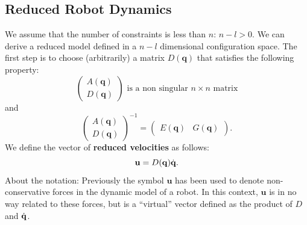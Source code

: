 \documentclass[10pt, a4paper]{report}
\newcommand{\q}{{\mathbf q}}
\begin{document}
\subsection{Reduced Robot Dynamics}
We assume that the number of constraints is less than $n$: $n-l>0$. We can derive a reduced model defined in a $n-l$ dimensional configuration space. The first step is to choose (arbitrarily) a matrix $D(\q)$ that satisfies the following property:\begin{equation}
    \begin{pmatrix}
        A(\q)\\ D(\q)
    \end{pmatrix}\text{ is a non singular $n\times n$ matrix}
\end{equation}
and\begin{equation}
    \begin{pmatrix}
        A(\q)\\ D(\q)
    \end{pmatrix}^{-1}=\begin{pmatrix}
        E(\q)& G(\q)
    \end{pmatrix}.
\end{equation}
We define the vector of \textbf{reduced velocities} as follows:\begin{equation}
    \mathbf u=D(\q)\dq.
\end{equation}
About the notation: Previously the symbol $\mathbf u$ has been used to denote non-conservative forces in the dynamic model of a robot. In this context, $\mathbf u$ is in no way related to these forces, but is a ``virtual'' vector defined as the product of $D$ and ${\dot{\mathbf q}}$.
\end{document}
